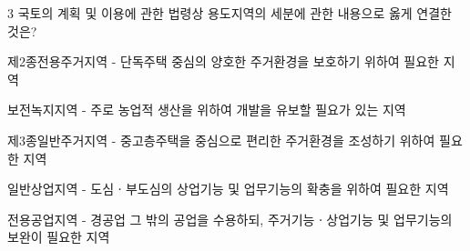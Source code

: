 \begin{question}{3}
국토의 계획 및 이용에 관한 법령상 용도지역의 세분에 관한 내용으로 옳게 연결한 것은?
\begin{choices}
  \item 제2종전용주거지역 - 단독주택 중심의 양호한 주거환경을 보호하기 위하여 필요한 지역
  \item 보전녹지지역 - 주로 농업적 생산을 위하여 개발을 유보할 필요가 있는 지역
  \item 제3종일반주거지역 - 중고층주택을 중심으로 편리한 주거환경을 조성하기 위하여 필요한 지역
  \item 일반상업지역 - 도심ㆍ부도심의 상업기능 및 업무기능의 확충을 위하여 필요한 지역
  \item 전용공업지역 - 경공업 그 밖의 공업을 수용하되, 주거기능ㆍ상업기능 및 업무기능의 보완이 필요한 지역
\end{choices}
\end{question}
